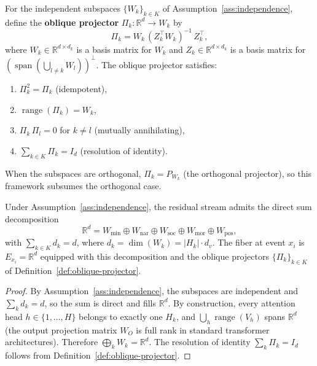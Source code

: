 \begin{definition}
\label{def:oblique-projector}
For the independent subspaces $\{W_k\}_{k \in K}$ of Assumption~\ref{ass:independence},
define the \textbf{oblique projector} $\Pi_k : \mathbb{R}^d \to W_k$ by
\[
    \Pi_k = W_k\, (Z_k^\top W_k)^{-1}\, Z_k^\top,
\]
where $W_k \in \mathbb{R}^{d \times d_k}$ is a basis matrix for $W_k$ and $Z_k \in
\mathbb{R}^{d \times d_k}$ is a basis matrix for $(\operatorname{span}(\bigcup_{l \neq k}
W_l))^\perp$. The oblique projector satisfies:
\begin{enumerate}
    \item $\Pi_k^2 = \Pi_k$ (idempotent),
    \item $\operatorname{range}(\Pi_k) = W_k$,
    \item $\Pi_k\, \Pi_l = 0$ for $k \neq l$ (mutually annihilating),
    \item $\sum_{k \in K} \Pi_k = I_d$ (resolution of identity).
\end{enumerate}
When the subspaces are orthogonal, $\Pi_k = P_{W_k}$ (the orthogonal projector), so this
framework subsumes the orthogonal case.
\end{definition}

\begin{proposition}
\label{prop:fiber-decomposition}
Under Assumption~\ref{ass:independence}, the residual stream admits the direct sum
decomposition
\[
    \mathbb{R}^d = W_{\mathrm{min}} \oplus W_{\mathrm{nar}} \oplus W_{\mathrm{soc}}
    \oplus W_{\mathrm{mor}} \oplus W_{\mathrm{pos}},
\]
with $\sum_{k \in K} d_k = d$, where $d_k = \dim(W_k) = |H_k| \cdot d_v$. The fiber at
event $x_i$ is $E_{x_i} = \mathbb{R}^d$ equipped with this decomposition and the oblique
projectors $\{\Pi_k\}_{k \in K}$ of Definition~\ref{def:oblique-projector}.
\end{proposition}

\begin{proof}
By Assumption~\ref{ass:independence}, the subspaces are independent and
$\sum_k d_k = d$, so the sum is direct and fills $\mathbb{R}^d$. By construction,
every attention head $h \in \{1,\ldots,H\}$ belongs to exactly one $H_k$, and
$\bigcup_h \operatorname{range}(V_h)$ spans $\mathbb{R}^d$ (the output projection matrix
$W_O$ is full rank in standard transformer architectures). Therefore $\bigoplus_k W_k =
\mathbb{R}^d$. The resolution of identity $\sum_k \Pi_k = I_d$ follows from
Definition~\ref{def:oblique-projector}.
\end{proof}


